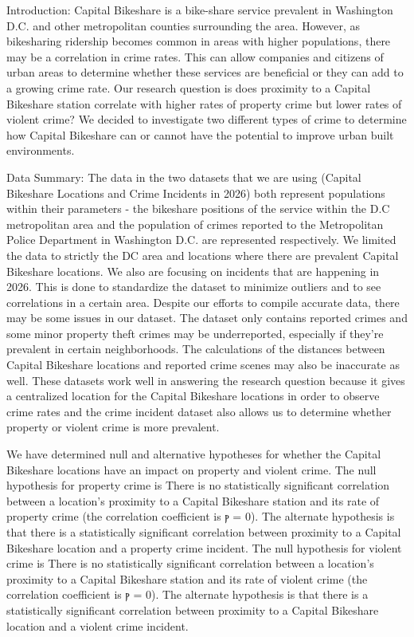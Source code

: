 Introduction: Capital Bikeshare is a bike-share service prevalent in Washington D.C. and other metropolitan counties surrounding the area. However, as bikesharing ridership becomes common in areas with higher populations, there may be a correlation in crime rates. This can allow companies and citizens of urban areas to determine whether these services are beneficial or they can add to a growing crime rate. Our research question is does proximity to a Capital Bikeshare station correlate with higher rates of property crime but lower rates of violent crime? We decided to investigate two different types of crime to determine how Capital Bikeshare can or cannot have the potential to improve urban built environments. 

Data Summary: The data in the two datasets that we are using (Capital Bikeshare Locations and Crime Incidents in 2026) both represent populations within their parameters - the bikeshare positions of the service within the D.C metropolitan area and the population of crimes reported to the Metropolitan Police Department in Washington D.C. are represented respectively. We limited the data to strictly the DC area and locations where there are prevalent Capital Bikeshare locations. We also are focusing on incidents that are happening in 2026. This is done to standardize the dataset to minimize outliers and to see correlations in a certain area. Despite our efforts to compile accurate data, there may be some issues in our dataset. The dataset only contains reported crimes and some minor property theft crimes may be underreported, especially if they’re prevalent in certain neighborhoods. The calculations of the distances between Capital Bikeshare locations and reported crime scenes may also be inaccurate as well. These datasets work well in answering the research question because it gives a centralized location for the Capital Bikeshare locations in order to observe crime rates and the crime incident dataset also allows us to determine whether property or violent crime is more prevalent.

We have determined null and alternative hypotheses for whether the Capital Bikeshare locations have an impact on property and violent crime. The null hypothesis for property crime is There is no statistically significant correlation between a location's proximity to a Capital Bikeshare station and its rate of property crime (the correlation coefficient is ⲣ = 0). The alternate hypothesis is that there is a statistically significant correlation between proximity to a Capital Bikeshare location and a property crime incident. The null hypothesis for violent crime is There is no statistically significant correlation between a location's proximity to a Capital Bikeshare station and its rate of violent crime (the correlation coefficient is ⲣ = 0). The alternate hypothesis is that there is a statistically significant correlation between proximity to a Capital Bikeshare location and a violent crime incident.
